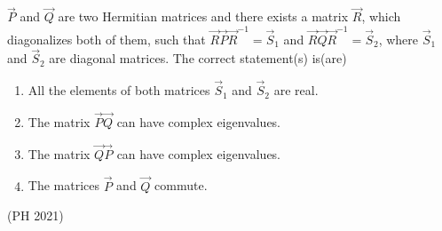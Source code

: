 \item $\vec{P}$ and $\vec{Q}$ are two Hermitian matrices and there exists a matrix $\vec{R}$, which diagonalizes both of them, such that $\vec{R}\vec{P}\vec{R}^{-1}=\vec{S}_1$ and $\vec{R}\vec{Q}\vec{R}^{-1}=\vec{S}_2$, where $\vec{S}_1$ and $\vec{S}_2$ are diagonal matrices. The correct statement(s) is(are)
\begin{enumerate}
\item All the elements of both matrices $\vec{S}_1$ and $\vec{S}_2$ are real.
\item The matrix $\vec{P}\vec{Q}$ can have complex eigenvalues.
\item The matrix $\vec{Q}\vec{P}$ can have complex eigenvalues.
\item The matrices $\vec{P}$ and $\vec{Q}$ commute.
\end{enumerate}
\hfill {(PH 2021)}
